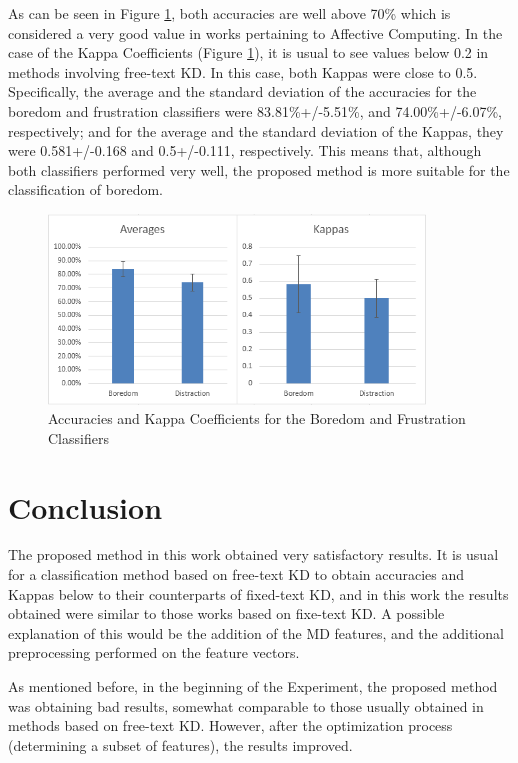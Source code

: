 \documentclass[runningheads,a4paper]{llncs}
\begin{document}
As can be seen in Figure \ref{accuracies-kappas}, both accuracies are well above 70\% which is considered a very good value in works pertaining to Affective Computing. In the case of the Kappa Coefficients (Figure \ref{accuracies-kappas}), it is usual to see values below 0.2 in methods involving free-text KD. In this case, both Kappas were close to 0.5. Specifically, the average and the standard deviation of the accuracies for the boredom and frustration classifiers were 83.81\%+/-5.51\%, and 74.00\%+/-6.07\%, respectively; and for the average and the standard deviation of the Kappas, they were 0.581+/-0.168 and 0.5+/-0.111, respectively. This means that, although both classifiers performed very well, the proposed method is more suitable for the classification of boredom.

\begin{figure}[htp]
  \centerline{\includegraphics[width=10cm]{accuracy-kappa.png}}
  \caption{Accuracies and Kappa Coefficients for the Boredom and Frustration Classifiers}
  \label{accuracies-kappas}
\end{figure}

\section{Conclusion}
\label{conclusion}

The proposed method in this work obtained very satisfactory results. It is usual for a classification method based on free-text KD to obtain accuracies and Kappas below to their counterparts of fixed-text KD, and in this work the results obtained were similar to those works based on fixe-text KD. A possible explanation of this would be the addition of the MD features, and the additional preprocessing performed on the feature vectors.

As mentioned before, in the beginning of the Experiment, the proposed method was obtaining bad results, somewhat comparable to those usually obtained in methods based on free-text KD. However, after the optimization process (determining a subset of features), the results improved.
\end{document}
